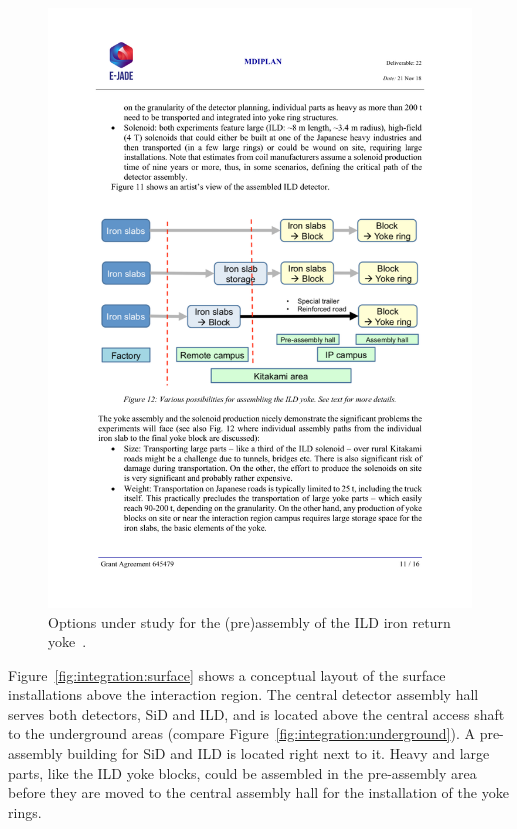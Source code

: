 
\begin{figure}[h!]
\centering
\includegraphics[width=0.8\hsize]{Integration/fig/yoke_assembly.pdf}
\caption{\label{fig:integration:yoke_assembly}Options under study for the (pre)assembly of the ILD iron return yoke~\cite{ild:bib:ejade_mdi}.}
\end{figure}

Figure~\ref{fig:integration:surface} shows a conceptual layout of the surface installations above the interaction region. The central detector assembly hall serves both detectors, SiD and ILD, and is located above the central access shaft to the underground areas (compare Figure~\ref{fig:integration:underground}). A pre-assembly building for SiD and ILD is located right next to it. Heavy and large parts, like the ILD yoke blocks, could be assembled in the pre-assembly area before they are moved to the central assembly hall for the installation of the yoke rings.

